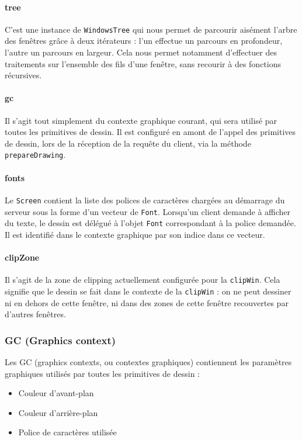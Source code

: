 \paragraph{tree}
C'est une instance de \verb|WindowsTree| qui nous permet de parcourir aisément l'arbre des fenêtres grâce à deux itérateurs : l'un effectue un parcours en profondeur, l'autre un parcours en largeur. Cela nous permet notamment d'effectuer des traitements sur l'ensemble des fils d'une fenêtre, sans recourir à des fonctions récursives.

\paragraph{gc}
Il s'agit tout simplement du contexte graphique courant, qui sera utilisé par toutes les primitives de dessin. Il est configuré en amont de l'appel des primitives de dessin, lors de la réception de la requête du client, via la méthode \verb|prepareDrawing|.

\paragraph{fonts}
Le \verb|Screen| contient la liste des polices de caractères chargées au démarrage du serveur sous la forme d'un vecteur de \verb|Font|. Lorsqu'un client demande à afficher du texte, le dessin est délégué à l'objet \verb|Font| correspondant à la police demandée. Il est identifié dans le contexte graphique par son indice dans ce vecteur.

\paragraph{clipZone}
Il s'agit de la zone de clipping actuellement configurée pour la \verb|clipWin|. Cela signifie que le dessin se fait dans le contexte de la \verb|clipWin| : on ne peut dessiner ni en dehors de cette fenêtre, ni dans des zones de cette fenêtre recouvertes par d'autres fenêtres.

\subsubsection{GC (Graphics context)}

Les GC (graphics contexts, ou contextes graphiques) contiennent les paramètres graphiques utilisés par toutes les primitives de dessin :
\begin{itemize}
  \item Couleur d'avant-plan
  \item Couleur d'arrière-plan
  \item Police de caractères utilisée
\end{itemize}

